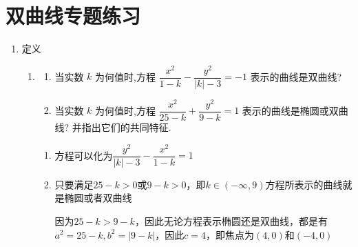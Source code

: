 \chapter*{双曲线专题练习}
\begin{enumerate}
    \item 定义
    \begin{enumerate}
        \item \begin{enumerate}
            \item 当实数 $k$ 为何值时,方程 $\dfrac{{x}^{2}}{1 - k} - \dfrac{{y}^{2}}{\left| k\right|  - 3} =  - 1$ 表示的曲线是双曲线?
            \item 当实数 $k$ 为何值时,方程 $\dfrac{{x}^{2}}{{25} - k} + \dfrac{{y}^{2}}{9 - k} = 1$ 表示的曲线是椭圆或双曲线? 并指出它们的共同特征.
        \end{enumerate}
        \begin{jieda}
            \begin{enumerate}
                \item 方程可以化为$\dfrac{{y}^{2}}{\left| k\right|  - 3} - \dfrac{{x}^{2}}{1 - k} = 1$
                
                \item 只要满足$25-k>0$或$9-k>0$，即$k \in (-\infty, 9)$方程所表示的曲线就是椭圆或者双曲线

                因为$25-k > 9-k$，因此无论方程表示椭圆还是双曲线，都是有$a^2 = 25-k, b^2 = |9-k|$，因此$c = 4$，即焦点为$(4, 0)$和$(-4, 0)$
            \end{enumerate}
        \end{jieda}
        

\end{enumerate}
\end{enumerate}
